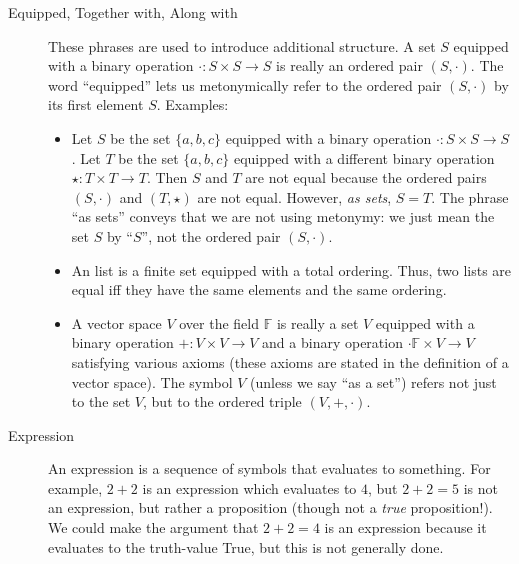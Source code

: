 \documentclass[12pt]{article}
\begin{document}
\begin{description}
  \item[Equipped, Together with, Along with] These phrases are
    used to introduce additional structure.  A set $S$ equipped with a
    binary operation $\cdot:S\times S\rightarrow S$ is really an
    ordered pair $(S,\cdot)$.  The word ``equipped'' lets us
    metonymically refer to the ordered pair $(S,\cdot)$ by its first
    element $S$.  Examples:
    \begin{itemize}
    \item Let $S$ be the set $\{a,b,c\}$ equipped with a binary
      operation $\cdot:S\times S\rightarrow S$.  Let $T$ be the set
      $\{a,b,c\}$ equipped with a different binary operation $\star:
      T\times T\rightarrow T$.  Then $S$ and $T$ are not equal because
      the ordered pairs $(S,\cdot)$ and $(T,\star)$ are not equal.
      However, \textit{as sets}, $S=T$.  The phrase ``as sets''
      conveys that we are not using metonymy: we just mean the set $S$
      by ``$S$'', not the ordered pair $(S,\cdot)$. 
    \item An list is a finite set equipped with a total ordering.
      Thus, two lists are equal iff they have the same elements and
      the same ordering. 
    \item A vector space $V$ over the field $\mathbb{F}$ is really a
      set $V$ equipped with a binary operation $+:V\times V\rightarrow
      V$ and a binary operation $\cdot \mathbb{F}\times V\rightarrow
      V$ satisfying various axioms (these axioms are stated in the
      definition of a vector space).  The symbol $V$ (unless we say
      ``as a set'') refers not just to the set $V$, but to the ordered
      triple $(V, +, \cdot)$. 
    \end{itemize}

  \item[Expression] An expression is a sequence of symbols that
    evaluates to something.  For example, $2+2$ is an expression which
    evaluates to $4$, but $2+2=5$ is not an expression, but rather a
    proposition (though not a \textit{true} proposition!).  We could
    make the argument that $2+2=4$ is an expression because it
    evaluates to the truth-value True, but this is not generally done.


\end{description}
\end{document}
